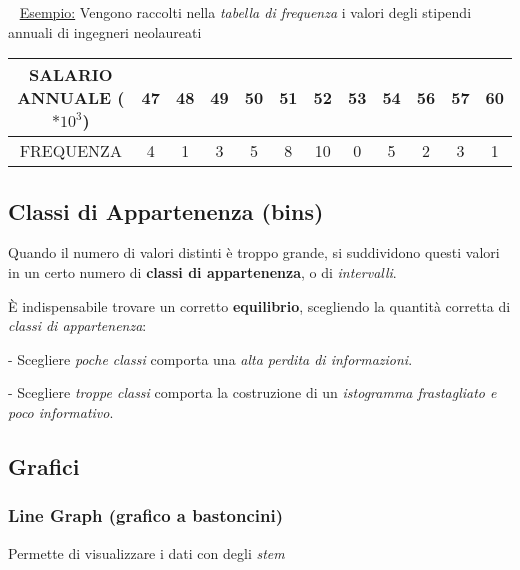 \documentclass[11pt,oneside,draft]{book}
\begin{document}
~\newline
\underline{Esempio:} \newline
\noindent Vengono raccolti nella \emph{tabella di frequenza} i valori degli stipendi annuali di
ingegneri neolaureati

\begin{center}
    \bgroup
    \def\arraystretch{1.5}
    \begin{tabular}{ |c| c c c c c c c c c c c|}
        \hline
        SALARIO ANNUALE ($*10^3$) & 47 & 48 & 49 & 50 & 51 & 52 & 53 & 54 & 56 & 57 & 60 \\
        \hline
        FREQUENZA                 & 4  & 1  & 3  & 5  & 8  & 10 & 0  & 5  & 2  & 3  & 1  \\
        \hline
    \end{tabular}
    \egroup
\end{center}

\subsection{Classi di Appartenenza (bins)}
Quando il numero di valori distinti è troppo grande, si suddividono questi valori in un certo
numero di \textbf{classi di appartenenza}, o di \emph{intervalli}.

È indispensabile trovare un corretto \textbf{equilibrio}, scegliendo la quantità corretta di \emph{classi di appartenenza}:

- Scegliere \emph{poche classi} comporta una \emph{alta perdita di informazioni}.

- Scegliere \emph{troppe classi} comporta la costruzione di un \emph{istogramma frastagliato e poco informativo}.


\subsection{Grafici}
\subsubsection{Line Graph (grafico a bastoncini)}
Permette di visualizzare i dati con degli \emph{stem}

\end{document}
